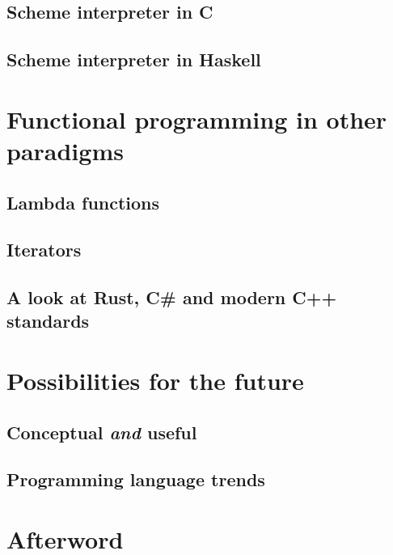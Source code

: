 \documentclass[11pt]{article}
\begin{document}
\subsection{Scheme interpreter in C}

\subsection{Scheme interpreter in Haskell}

\section{Functional programming in other paradigms}

\subsection{Lambda functions}

\subsection{Iterators}

\subsection{A look at Rust, C\# and modern C++ standards}

\section{Possibilities for the future}

\subsection{Conceptual \emph{and} useful}

\subsection{Programming language trends}

\section*{Afterword}


\newpage
\printbibliography[heading=bibintoc, title={References}]
\end{document}
